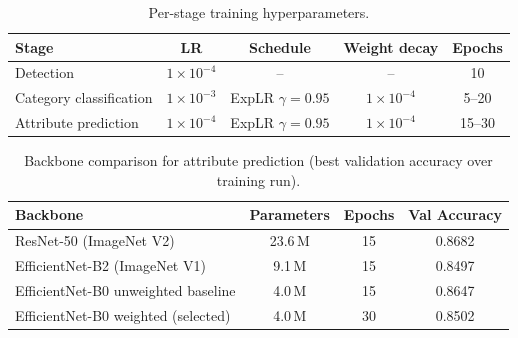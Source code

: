 \documentclass{article}
\begin{document}
\begin{table}[H]
\centering
\begin{tabular}{lcccc}
\toprule
Stage & LR & Schedule & Weight decay & Epochs \\
\midrule
Detection                & $1\times10^{-4}$ & --                  & --               & 10     \\
Category classification  & $1\times10^{-3}$ & ExpLR $\gamma=0.95$ & $1\times10^{-4}$ & 5--20  \\
Attribute prediction     & $1\times10^{-4}$ & ExpLR $\gamma=0.95$ & $1\times10^{-4}$ & 15--30 \\
\bottomrule
\end{tabular}
\caption{Per-stage training hyperparameters.}
\label{tab:hyperparams}
\end{table}

\begin{table}[H]
\centering
\caption{Backbone comparison for attribute prediction (best validation accuracy over training run).}
\label{tab:attr_backbone_comparison}
\begin{tabular}{lccc}
\toprule
Backbone & Parameters & Epochs & Val Accuracy \\
\midrule
ResNet-50 (ImageNet V2)              & 23.6\,M & 15 & 0.8682 \\
EfficientNet-B2 (ImageNet V1)        &  9.1\,M & 15 & 0.8497 \\
EfficientNet-B0 unweighted baseline  &  4.0\,M & 15 & 0.8647 \\
EfficientNet-B0 weighted (selected)  &  4.0\,M & 30 & 0.8502 \\
\bottomrule
\end{tabular}
\end{table}



\end{document}
